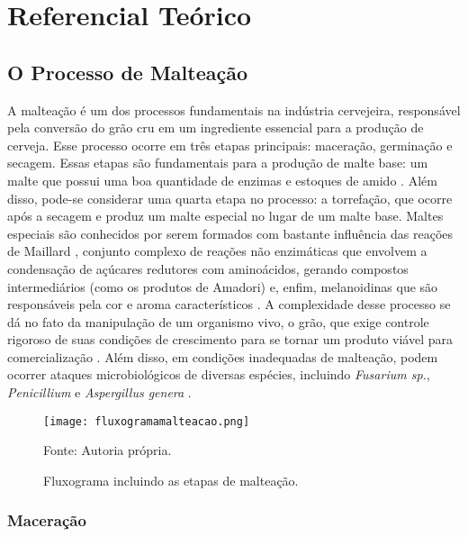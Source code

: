 \chapter[Referencial Teórico]{Referencial Teórico}

\section{O Processo de Malteação}

A malteação é um dos processos fundamentais na indústria cervejeira, responsável pela conversão do grão cru em um ingrediente essencial para a produção de cerveja. Esse processo ocorre em três etapas principais: maceração, germinação e secagem. Essas etapas são fundamentais para a produção de malte base: um malte que possui uma boa quantidade de enzimas e estoques de amido \cite{BRIGGS2004,CENCI2021}. Além disso, pode-se considerar uma quarta etapa no processo: a torrefação, que ocorre após a secagem e produz um malte especial no lugar de um malte base. Maltes especiais são conhecidos por serem formados com bastante influência das reações de Maillard \cite{COGHE2004}, conjunto complexo de reações não enzimáticas que envolvem a condensação de açúcares redutores com aminoácidos, gerando compostos intermediários (como os produtos de Amadori) e, enfim, melanoidinas que são responsáveis pela cor e aroma característicos \cite{nursten2005maillard}. A complexidade desse processo se dá no fato da manipulação de um organismo vivo, o grão, que exige controle rigoroso de suas condições de crescimento para se tornar um produto viável para comercialização \cite{MALLETT2022}. Além disso, em condições inadequadas de malteação, podem ocorrer ataques microbiológicos de diversas espécies, incluindo \textit{Fusarium sp.}, \textit{Penicillium} e \textit{Aspergillus genera} \cite{LUARASI2016}.

\begin{figure}[ht]
    \centering
    \caption{Fluxograma incluindo as etapas de malteação.}
    \label{fig:fluxogramamalteacao}
    \texttt{[image: fluxogramamalteacao.png]}

    {\centering\footnotesize Fonte: Autoria própria.\par}
\end{figure}

\subsection{Maceração}

